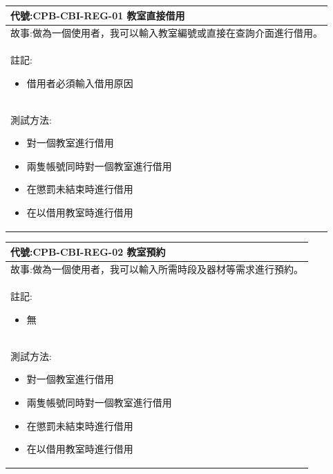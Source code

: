 \documentclass{article}
\begin{document}
\begin{table}
    \begin{tabular}{| m{13cm} |}
		\hline
	代號:CPB-CBI-REG-01	教室直接借用	\\ \hline
	故事:做為一個使用者，我可以輸入教室編號或直接在查詢介面進行借用。		\\	\hline
	註記:
	\begin{itemize}
		\item 借用者必須輸入借用原因
	\end{itemize}		\\ \hline
	測試方法:	
	\begin{itemize}
		\item 對一個教室進行借用
		\item 兩隻帳號同時對一個教室進行借用
		\item 在懲罰未結束時進行借用
		\item 在以借用教室時進行借用
	\end{itemize}
	\\	\hline
    \end{tabular}
\end{table}

\begin{table}
    \begin{tabular}{| m{13cm} |}
		\hline
	代號:CPB-CBI-REG-02	教室預約	\\ \hline
	故事:做為一個使用者，我可以輸入所需時段及器材等需求進行預約。		\\	\hline
	註記:
	\begin{itemize}
		\item 無
	\end{itemize}		\\ \hline
	測試方法:	
	\begin{itemize}
		\item 對一個教室進行借用
		\item 兩隻帳號同時對一個教室進行借用
		\item 在懲罰未結束時進行借用
		\item 在以借用教室時進行借用
	\end{itemize}
	\\	\hline
    \end{tabular}
\end{table}
\end{document}
